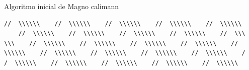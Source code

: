 \begin{example}{Algoritmo inicial de Magno calimann}
\begin{verbatim}
//  \\\\\\    //  \\\\\\    //  \\\\\\    //  \\\\\\    //  \\\\\\
    //  \\\\\\    //  \\\\\\    //  \\\\\\    //  \\\\\\    //  \\\
\\\    //  \\\\\\    //  \\\\\\    //  \\\\\\    //  \\\\\\    //  
\\\\\\    //  \\\\\\    //  \\\\\\    //  \\\\\\    //  \\\\\\    /
/  \\\\\\    //  \\\\\\    //  \\\\\\    //  \\\\\\    //  \\\\\\  

\end{verbatim}
\end{example}
